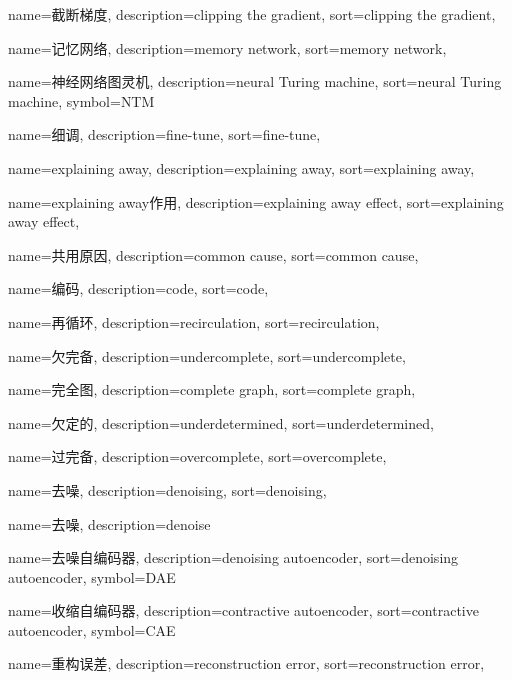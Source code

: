 {
  name=截断梯度,
  description={clipping the gradient},
  sort={clipping the gradient},
}

{
  name=记忆网络,
  description={memory network},
  sort={memory network},
}

{
  name=神经网络图灵机,
  description={neural Turing machine},
  sort={neural Turing machine},
  symbol={NTM}
}

{
  name=细调,
  description={fine-tune},
  sort={fine-tune},
}

{
  name=explaining away,
  description={explaining away},
  sort={explaining away},
}

{
  name=explaining away作用,
  description={explaining away effect},
  sort={explaining away effect},
}

{
  name=共用原因,
  description={common cause},
  sort={common cause},
}

{
  name=编码,
  description={code},
  sort={code},
}

{
  name=再循环,
  description={recirculation},
  sort={recirculation},
}

{
  name=欠完备,
  description={undercomplete},
  sort={undercomplete},
}


{
	name=完全图,
	description={complete graph},
	sort={complete graph},
}


{
	name=欠定的,
	description={underdetermined},
	sort={underdetermined},
}


{
  name=过完备,
  description={overcomplete},
  sort={overcomplete},
}

{
  name=去噪,
  description={denoising},
  sort={denoising},
}

{
  name=去噪,
  description={denoise}
}

{
  name=去噪自编码器,
  description={denoising autoencoder},
  sort={denoising autoencoder},
  symbol={DAE}
}

{
  name=收缩自编码器,
  description={contractive autoencoder},
  sort={contractive autoencoder},
  symbol={CAE}
}

{
  name=重构误差,
  description={reconstruction error},
  sort={reconstruction error},
}

